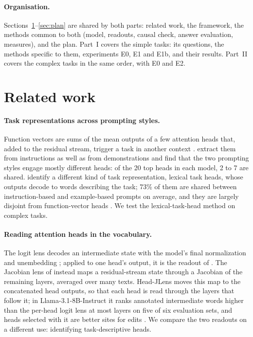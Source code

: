 \documentclass[11pt,a4paper]{article}
\begin{document}
\paragraph{Organisation.} Sections~\ref{sec:background}--\ref{sec:plan} are shared by both parts: related work, the framework, the methods common to both (model, readouts, causal check, answer evaluation, measures), and the plan. Part~I covers the simple tasks: its questions, the methods specific to them, experiments E0, E1 and E1b, and their results. Part~II covers the complex tasks in the same order, with E0 and E2.

\section{Related work}\label{sec:background}
\paragraph{Task representations across prompting styles.} Function vectors are sums of the mean outputs of a few attention heads that, added to the residual stream, trigger a task in another context \citep{todd2024function}. \citet{davidson2025different} extract them from instructions as well as from demonstrations and find that the two prompting styles engage mostly different heads: of the 20 top heads in each model, 2 to 7 are shared. \citet{yang2026shared} identify a different kind of task representation, lexical task heads, whose outputs decode to words describing the task; 73\% of them are shared between instruction-based and example-based prompts on average, and they are largely disjoint from function-vector heads \citep[App.~I]{yang2026shared}. We test the lexical-task-head method on complex tasks.

\paragraph{Reading attention heads in the vocabulary.} The logit lens decodes an intermediate state with the model's final normalization and unembedding \citep{nostalgebraist2020logitlens}; applied to one head's output, it is the readout of \citet{yang2026shared}. The Jacobian lens of \citet{gurnee2026workspace} instead maps a residual-stream state through a Jacobian of the remaining layers, averaged over many texts. Head-JLens moves this map to the concatenated head outputs, so that each head is read through the layers that follow it; in Llama-3.1-8B-Instruct it ranks annotated intermediate words higher than the per-head logit lens at most layers on five of six evaluation sets, and heads selected with it are better sites for edits \citep{merlo2026headjlens}. We compare the two readouts on a different use: identifying task-descriptive heads.
\end{document}
